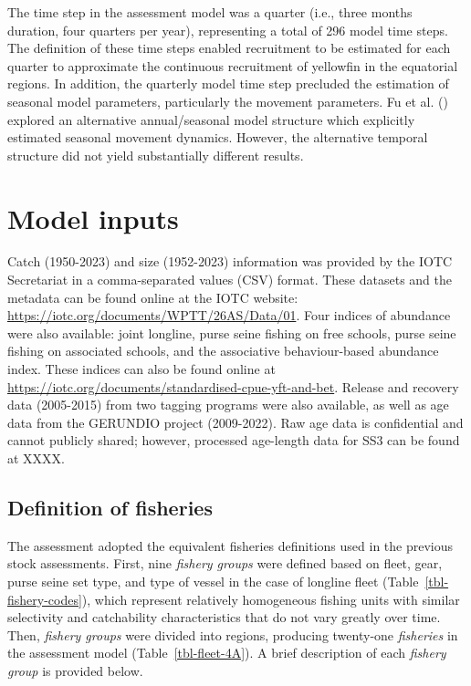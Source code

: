 \documentclass[
]{scrartcl}
\begin{document}
The time step in the assessment model was a quarter (i.e., three months
duration, four quarters per year), representing a total of 296 model
time steps. The definition of these time steps enabled recruitment to be
estimated for each quarter to approximate the continuous recruitment of
yellowfin in the equatorial regions. In addition, the quarterly model
time step precluded the estimation of seasonal model parameters,
particularly the movement parameters. Fu et al.
() explored an
alternative annual/seasonal model structure which explicitly estimated
seasonal movement dynamics. However, the alternative temporal structure
did not yield substantially different results.

\section{Model inputs}\label{model-inputs}

Catch (1950-2023) and size (1952-2023) information was provided by the
IOTC Secretariat in a comma-separated values (CSV) format. These
datasets and the metadata can be found online at the IOTC website:
\url{https://iotc.org/documents/WPTT/26AS/Data/01}. Four indices of
abundance were also available: joint longline, purse seine fishing on
free schools, purse seine fishing on associated schools, and the
associative behaviour-based abundance index. These indices can also be
found online at
\url{https://iotc.org/documents/standardised-cpue-yft-and-bet}. Release
and recovery data (2005-2015) from two tagging programs were also
available, as well as age data from the GERUNDIO project (2009-2022).
Raw age data is confidential and cannot publicly shared; however,
processed age-length data for SS3 can be found at XXXX.

\subsection{Definition of fisheries}\label{definition-of-fisheries}

The assessment adopted the equivalent fisheries definitions used in the
previous stock assessments. First, nine \emph{fishery groups} were
defined based on fleet, gear, purse seine set type, and type of vessel
in the case of longline fleet (Table~\ref{tbl-fishery-codes}), which
represent relatively homogeneous fishing units with similar selectivity
and catchability characteristics that do not vary greatly over time.
Then, \emph{fishery groups} were divided into regions, producing
twenty-one \emph{fisheries} in the assessment model
(Table~\ref{tbl-fleet-4A}). A brief description of each \emph{fishery
group} is provided below.
\end{document}
